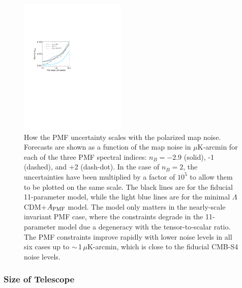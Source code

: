 \documentclass[apj]{emulateapj}
\newcommand{\apmf}{\ensuremath{A_{\rm PMF}}}
\newcommand{\lcdm}{\ensuremath{\Lambda}CDM}
\newcommand{\ukarcmin}{\ensuremath{\mu}{\rm K-arcmin}}
\begin{document}
\begin{figure}[htb]\centering
\includegraphics[width=0.45\textwidth,clip,trim={2.cm 12.5cm 11cm 7.5cm}]{pmf_sens.pdf}
  \caption[]{ \label{fig:sensitivity}
  How the PMF uncertainty  scales with the polarized map noise. 
  Forecasts are shown as a function of the map noise in \ukarcmin{} for each of the three PMF spectral indices: $n_B = -2.9$ (solid), -1 (dashed), and +2 (dash-dot). 
  In the case of $n_B=2$, the uncertainties have been multiplied by a factor of $10^5$ to allow them to be plotted on the same scale. 
  The black lines are for the fiducial 11-parameter model, while the light blue lines are for the minimal \lcdm{}+\apmf{} model. 
  The model only matters in the nearly-scale invariant PMF case, where the constraints degrade in the 11-parameter model due a degeneracy with the tensor-to-scalar ratio. 
  The PMF constraints improve rapidly with lower noise levels in all six cases up to $\sim$\,1\,\ukarcmin, which is close to the  fiducial CMB-S4 noise levels. 
    }
\end{figure}

\subsubsection{Size of Telescope }
\end{document}
